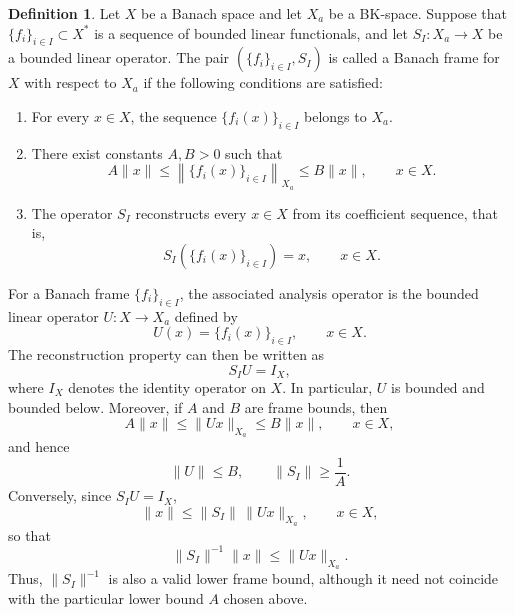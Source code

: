\documentclass[12pt]{article}
\theoremstyle{definition}
\newtheorem{definition}[theorem]{Definition}
\theoremstyle{remark}
\begin{document}
\medskip

\begin{definition}
	Let \(X\) be a Banach space and let \(X_a\) be a BK-space. Suppose that
	\(\{f_i\}_{i\in I}\subset X^*\) is a sequence of bounded linear
	functionals, and let \(S_I:X_a\to X\) be a bounded linear operator.
	The pair \((\{f_i\}_{i\in I},S_I)\) is called a Banach frame for \(X\)
	with respect to \(X_a\) if the following conditions are satisfied:
	\begin{enumerate}
		\item For every \(x\in X\), the sequence
		\(\{f_i(x)\}_{i\in I}\) belongs to \(X_a\).
		
		\item There exist constants \(A,B>0\) such that
		\[
		A\|x\|
		\leq
		\left\|\{f_i(x)\}_{i\in I}\right\|_{X_a}
		\leq
		B\|x\|,
		\qquad x\in X.
		\]
		
		\item The operator \(S_I\) reconstructs every \(x\in X\) from its
		coefficient sequence, that is,
		\[
		S_I\left(\{f_i(x)\}_{i\in I}\right)=x,
		\qquad x\in X.
		\]
	\end{enumerate}
\end{definition}

For a Banach frame \(\{f_i\}_{i\in I}\), the associated analysis operator
is the bounded linear operator \(U:X\to X_a\) defined by
\[
U(x)=\{f_i(x)\}_{i\in I},
\qquad x\in X.
\]
The reconstruction property can then be written as
\[
S_IU=I_X,
\]
where \(I_X\) denotes the identity operator on \(X\). In particular,
\(U\) is bounded and bounded below. Moreover, if \(A\) and \(B\) are
frame bounds, then
\[
A\|x\|\leq \|Ux\|_{X_a}\leq B\|x\|,
\qquad x\in X,
\]
and hence
\[
\|U\|\leq B,
\qquad
\|S_I\|\geq \frac{1}{A}.
\]
Conversely, since \(S_IU=I_X\),
\[
\|x\|
\leq
\|S_I\|\,\|Ux\|_{X_a},
\qquad x\in X,
\]
so that
\[
\|S_I\|^{-1}\|x\|
\leq
\|Ux\|_{X_a}.
\]
Thus, \(\|S_I\|^{-1}\) is also a valid lower frame bound, although it
need not coincide with the particular lower bound \(A\) chosen above.
\end{document}
